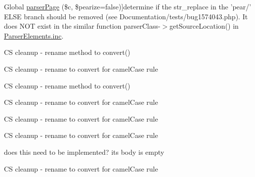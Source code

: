 \begin{DoxyRefList}
\hypertarget{todo__todo000144}{}%
\-Global \hyperlink{classparser_page_a263e11db9579a5665a2ec25fbc9b2c9c}{parser\-Page} (\$c, \$pearize=false)]determine if the str\-\_\-replace in the 'pear/' \-E\-L\-S\-E branch should be removed (see \-Documentation/tests/bug1574043.\-php). \-It does \-N\-O\-T exist in the similar function parser\-Class-\/$>$get\-Source\-Location() in \hyperlink{_parser_elements_8inc}{\-Parser\-Elements.\-inc}.  
\item[\label{todo__todo000033}%
\hypertarget{todo__todo000033}{}%
\-Global \hyperlink{classparser_pre_ad6c06bea9d11cc1c362b592306cfa707}{parser\-Pre} (\&\$c)]\-C\-S cleanup -\/ rename method to convert()  
\item[\label{todo__todo000066}%
\hypertarget{todo__todo000066}{}%
\-Global \hyperlink{classparser_return_tag_a31e57fd66b58b300f8a489aa1b9431f6}{parser\-Return\-Tag} (\&\$converter)]\-C\-S cleanup -\/ rename to convert for camel\-Case rule  
\item[\label{todo__todo000037}%
\hypertarget{todo__todo000037}{}%
\-Global \hyperlink{classparser_samp_ad6c06bea9d11cc1c362b592306cfa707}{parser\-Samp} (\&\$c)]\-C\-S cleanup -\/ rename method to convert()  
\item[\label{todo__todo000067}%
\hypertarget{todo__todo000067}{}%
\-Global \hyperlink{classparser_see_tag_a31e57fd66b58b300f8a489aa1b9431f6}{parser\-See\-Tag} (\&\$converter)]\-C\-S cleanup -\/ rename to convert for camel\-Case rule  
\item[\label{todo__todo000115}%
\hypertarget{todo__todo000115}{}%
\-Global \hyperlink{classparser_source_inline_tag_ad6c06bea9d11cc1c362b592306cfa707}{parser\-Source\-Inline\-Tag} (\&\$c)]\-C\-S cleanup -\/ rename to convert for camel\-Case rule  
\item[\label{todo__todo000145}%
\hypertarget{todo__todo000145}{}%
\-Global \hyperlink{classparser_string_with_inline_tags_a0cd1d8e1e41d6daa6bcdfdb8ed60b35b}{parser\-String\-With\-Inline\-Tags} (\&\$converter, \$postprocess=true, \$trim=true)]\-C\-S cleanup -\/ rename to convert for camel\-Case rule  
\item[\label{todo__todo000062}%
\hypertarget{todo__todo000062}{}%
\-Global \hyperlink{classparser_tag_aae11335592fc37fa1dd8441092bfb2b8}{parser\-Tag} ()]does this need to be implemented? its body is empty  
\item[\label{todo__todo000061}%
\hypertarget{todo__todo000061}{}%
\-Global \hyperlink{classparser_tag_a31e57fd66b58b300f8a489aa1b9431f6}{parser\-Tag} (\&\$converter)]\-C\-S cleanup -\/ rename to convert for camel\-Case rule  

\end{DoxyRefList}
